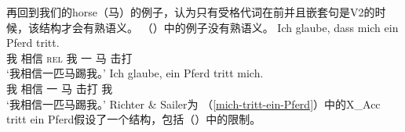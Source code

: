 再回到我们的horse（马）的例子，\citet[]{RS2009a}认为只有受格代词在前并且嵌套句是V2的时候，该结构才会有熟语义。 （）中的例子没有熟语义。
\eal
\ex 
\gll Ich glaube, dass mich ein Pferd tritt.\\
     我 相信   \textsc{rel} 我   一 马   击打\\
\glt `我相信一匹马踢我。'
\ex 
\gll Ich glaube, ein Pferd tritt mich.\\
    我 相信   一 马   击打 我\\
\glt `我相信一匹马踢我。'
\zl
Richter \& Sailer为 （\ref{mich-tritt-ein-Pferd}）中的X\_Acc tritt ein Pferd假设了一个结构，包括（）中的限制。

